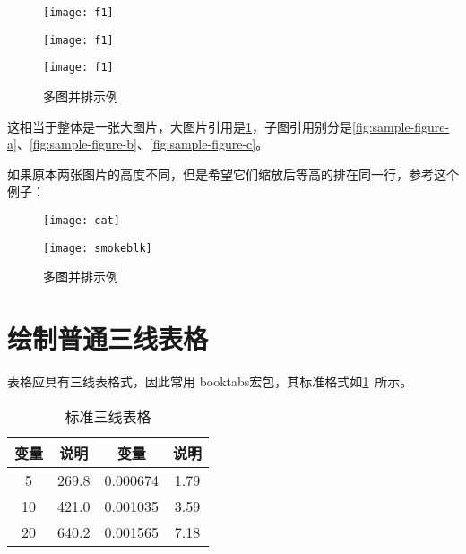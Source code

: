 \documentclass[withoutpreface,bwprint]{cumcmthesis} %
\begin{document}
\begin{figure}
    \centering
    \begin{minipage}[c]{0.3\textwidth}
        \centering
        \texttt{[image: f1]}
        \label{fig:sample-figure-a}
    \end{minipage}
    \begin{minipage}[c]{0.3\textwidth}
        \centering
        \texttt{[image: f1]}
        \label{fig:sample-figure-b}
    \end{minipage}
    \begin{minipage}[c]{0.3\textwidth}
        \centering
        \texttt{[image: f1]}
        \label{fig:sample-figure-c}
    \end{minipage}
    \caption{多图并排示例}
    \label{fig:sample-figure}
\end{figure}
这相当于整体是一张大图片，大图片引用是\cref{fig:sample-figure}，子图引用别分是\cref{fig:sample-figure-a}、\cref{fig:sample-figure-b}、\cref{fig:sample-figure-c}。

如果原本两张图片的高度不同，但是希望它们缩放后等高的排在同一行，参考这个例子：
\begin{figure}
    \centering
    \begin{minipage}[c]{0.48\textwidth}
        \centering
        \texttt{[image: cat]}
    \end{minipage}
    \begin{minipage}[c]{0.48\textwidth}
        \centering
        \texttt{[image: smokeblk]}
    \end{minipage}
    \caption{多图并排示例}
\end{figure}

\section{绘制普通三线表格}
表格应具有三线表格式，因此常用 booktabs宏包，其标准格式如\cref{tab:001}~所示。
\begin{table}[!htbp]
    \caption{标准三线表格}\label{tab:001} \centering
    \begin{tabular}{cccc}
        \toprule[1.5pt]
        变量 & 说明 & 变量 &  说明 \\
        \midrule[1pt]
        5 & 269.8 & 0.000674 & 1.79  \\
        10 & 421.0 & 0.001035 & 3.59 \\
        20 & 640.2 & 0.001565 & 7.18 \\
        \bottomrule[1.5pt]
    \end{tabular}
\end{table}
\end{document}
